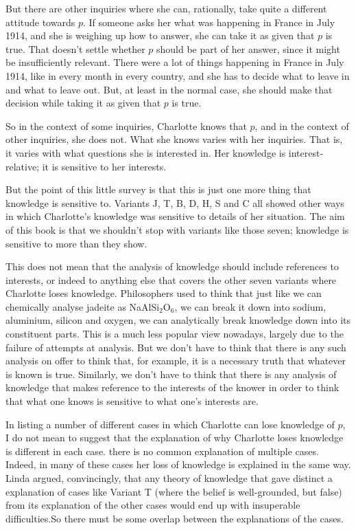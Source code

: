 \documentclass[11pt,]{book}
\begin{document}
But there are other inquiries where she can, rationally, take quite a different attitude towards \(p\). If someone asks her what was happening in France in July 1914, and she is weighing up how to answer, she can take it as given that \(p\) is true. That doesn't settle whether \(p\) should be part of her answer, since it might be insufficiently relevant. There were a lot of things happening in France in July 1914, like in every month in every country, and she has to decide what to leave in and what to leave out. But, at least in the normal case, she should make that decision while taking it as given that \(p\) is true.

So in the context of some inquiries, Charlotte knows that \(p\), and in the context of other inquiries, she does not. What she knows varies with her inquiries. That is, it varies with what questions she is interested in. Her knowledge is interest-relative; it is sensitive to her interests.

But the point of this little survey is that this is just one more thing that knowledge is sensitive to. Variants J, T, B, D, H, S and C all showed other ways in which Charlotte's knowledge was sensitive to details of her situation. The aim of this book is that we shouldn't stop with variants like those seven; knowledge is sensitive to more than they show.

This does not mean that the analysis of knowledge should include references to interests, or indeed to anything else that covers the other seven variants where Charlotte loses knowledge. Philosophers used to think that just like we can chemically analyse jadeite as NaAlSi\(_2\)O\(_6\), we can break it down into sodium, aluminium, silicon and oxygen, we can analytically break knowledge down into its constituent parts. This is a much less popular view nowadays, largely due to the failure of attempts at analysis. But we don't have to think that there is any such analysis on offer to think that, for example, it is a necessary truth that whatever is known is true. Similarly, we don't have to think that there is any analysis of knowledge that makes reference to the interests of the knower in order to think that what one knows is sensitive to what one's interests are.

In listing a number of different cases in which Charlotte can lose knowledge of \(p\), I do not mean to suggest that the explanation of why Charlotte loses knowledge is different in each case. there is no common explanation of multiple cases. Indeed, in many of these cases her loss of knowledge is explained in the same way. Linda \citet{Zagzebski1994} argued, convincingly, that any theory of knowledge that gave distinct a explanation of cases like Variant T (where the belief is well-grounded, but false) from its explanation of the other cases would end up with insuperable difficulties.So there must be some overlap between the explanations of the cases.
\end{document}
